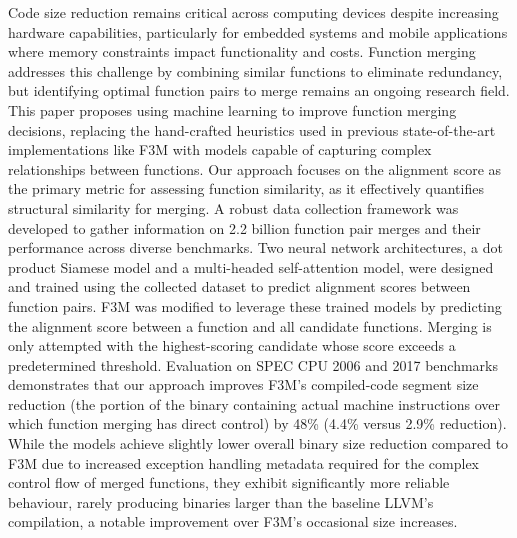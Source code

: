 %
\singlespacing
{


Code size reduction remains critical across computing devices despite increasing hardware capabilities, particularly for embedded systems and mobile applications where memory constraints impact functionality and costs. Function merging addresses this challenge by combining similar functions to eliminate redundancy, but identifying optimal function pairs to merge remains an ongoing research field.
This paper proposes using machine learning to improve function merging decisions, replacing the hand-crafted heuristics used in previous state-of-the-art implementations like F3M with models capable of capturing complex relationships between functions. Our approach focuses on the alignment score as the primary metric for assessing function similarity, as it effectively quantifies structural similarity for merging.
A robust data collection framework was developed to gather information on 2.2 billion function pair merges and their performance across diverse benchmarks. Two neural network architectures, a dot product Siamese model and a multi-headed self-attention model, were designed and trained using the collected dataset to predict alignment scores between function pairs.
F3M was modified to leverage these trained models by predicting the alignment score between a function and all candidate functions. Merging is only attempted with the highest-scoring candidate whose score exceeds a predetermined threshold. Evaluation on SPEC CPU 2006 and 2017 benchmarks demonstrates that our approach improves F3M's compiled-code segment size reduction (the portion of the binary containing actual machine instructions over which function merging has direct control) by 48\% (4.4\% versus 2.9\% reduction).
While the models achieve slightly lower overall binary size reduction compared to F3M due to increased exception handling metadata required for the complex control flow of merged functions, they exhibit significantly more reliable behaviour, rarely producing binaries larger than the baseline LLVM's compilation, a notable improvement over F3M's occasional size increases.
}